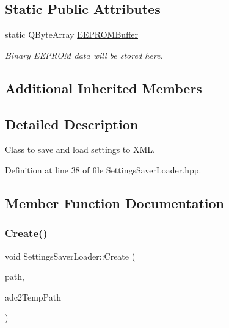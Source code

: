 \subsection*{Static Public Attributes}
\begin{DoxyCompactItemize}
\item 
\mbox{\label{class_settings_saver_loader_acc059094bacde4bb24fc7a8dbd1336e9}} 
static Q\+Byte\+Array \hyperlink{class_settings_saver_loader_acc059094bacde4bb24fc7a8dbd1336e9}{E\+E\+P\+R\+O\+M\+Buffer}
\begin{DoxyCompactList}\small\item\em Binary E\+E\+P\+R\+OM data will be stored here. \end{DoxyCompactList}\end{DoxyCompactItemize}
\subsection*{Additional Inherited Members}


\subsection{Detailed Description}
Class to save and load settings to X\+ML. 

Definition at line 38 of file Settings\+Saver\+Loader.\+hpp.



\subsection{Member Function Documentation}
\mbox{\label{class_settings_saver_loader_a23524241e3edea7f26b72807c0090bdc}} 
\subsubsection{\texorpdfstring{Create()}{Create()}}
{\footnotesize\ttfamily void Settings\+Saver\+Loader\+::\+Create (\begin{DoxyParamCaption}\item[{Q\+String}]{path,  }\item[{Q\+String}]{adc2\+Temp\+Path }\end{DoxyParamCaption})\hspace{0.3cm}{\ttfamily [virtual]}}



